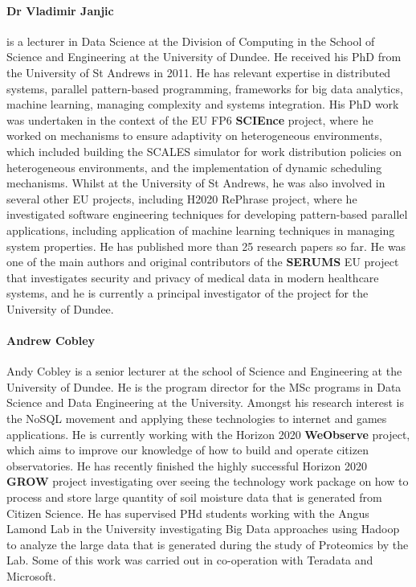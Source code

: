 \documentclass[a4paper,11pt]{article}
\begin{document}
\paragraph{Dr Vladimir Janjic} is a lecturer in Data Science at the Division of Computing in the School of Science and Engineering at the University of Dundee. He received his PhD from the University of St Andrews in 2011. He has relevant expertise in distributed systems, parallel pattern-based programming, frameworks for big data analytics, machine learning, managing complexity and systems integration. His PhD work was undertaken in the context of the EU FP6 \textbf{SCIEnce} project, where he worked on mechanisms to ensure adaptivity on heterogeneous environments, which included building the SCALES simulator for work distribution policies on heterogeneous environments, and the implementation of dynamic scheduling mechanisms. Whilst at the University of St Andrews, he was also involved in several other EU projects, including H2020 RePhrase project, where he investigated software engineering techniques for developing pattern-based parallel applications, including application of machine learning techniques in managing system properties. He has published more than 25 research papers so far. He was one of the main authors and original contributors of the \textbf{SERUMS} EU project that investigates security and privacy of medical data in modern healthcare systems, and he is currently a principal investigator of the project for the University of Dundee.

\paragraph{Andrew Cobley} Andy Cobley is a senior lecturer at the school of Science and Engineering at the University of Dundee.    He is the program director for the MSc programs in Data Science and Data Engineering at the University.   Amongst his research interest is the NoSQL movement and applying these technologies to internet and games applications. He is currently working with the Horizon 2020 \textbf{WeObserve} project, which aims to improve our knowledge of how to build and operate citizen observatories. He has recently finished the highly successful Horizon 2020 \textbf{GROW} project investigating over seeing the technology work package on how to process and store large quantity of  soil moisture data  that is generated from Citizen Science.  He has supervised PHd students working with the Angus Lamond Lab in the University investigating Big Data approaches using Hadoop to analyze the large data that is generated during the study of Proteomics by the Lab.  Some of this work was carried out in co-operation with Teradata and Microsoft.
\end{document}
